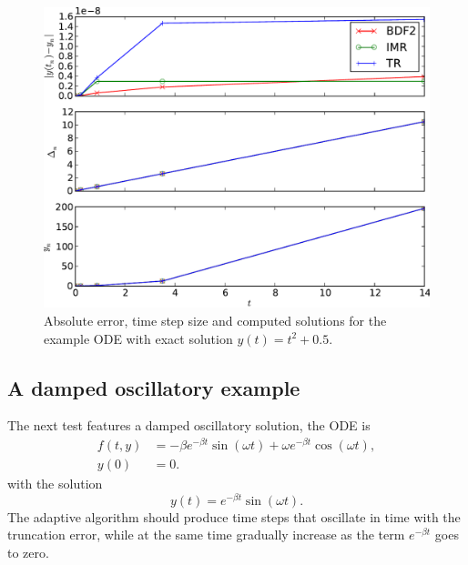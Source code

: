 \begin{figure}
  \centering
  \includegraphics[width=1\textwidth]{plots/aimr_odes_traces/poly2-errornormsvs-dtsvs-tracevaluesvstimes}
  \caption{Absolute error, time step size and computed solutions for the example ODE with exact solution $y(t) = t^2 + 0.5$.}
  \label{fig:imr-poly2-example}
\end{figure}


\subsection{A damped oscillatory example}
\label{sec:oscill-damp-example}

The next test features a damped oscillatory solution, the ODE is
\begin{equation}
  \label{eqn:imr-test-osc-damp}
  \begin{aligned}
    f(t,y) &= - \beta e^{-\beta t} \sin(\omega t) + \omega e^{-\beta t} \cos(\omega t), \\
    y(0) &= 0.
  \end{aligned}
\end{equation}
with the solution
\begin{equation}
  y(t) = e^{-\beta t} \sin(\omega t).
\end{equation}
The adaptive algorithm should produce time steps that oscillate in time with the truncation error, while at the same time gradually increase as the term $e^{-\beta t}$ goes to zero.

